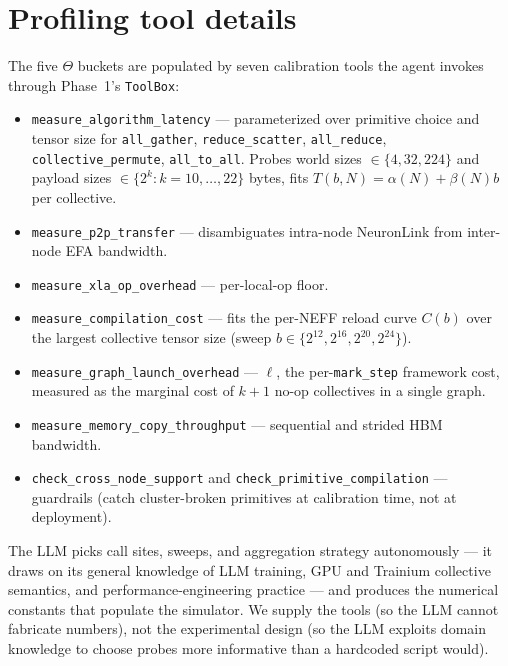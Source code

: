 \section{Profiling tool details}
\label{sec:profile-impl}

The five $\Theta$ buckets are populated by seven
calibration tools the agent invokes through Phase~1's
\texttt{ToolBox}:
\begin{itemize}
  \item \texttt{measure\_algorithm\_latency} ---
  parameterized over primitive choice and tensor size for
  \texttt{all\_gather}, \texttt{reduce\_scatter},
  \texttt{all\_reduce}, \texttt{collective\_permute},
  \texttt{all\_to\_all}. Probes world sizes $\in \{4, 32, 224\}$
  and payload sizes $\in \{2^k : k = 10, \ldots, 22\}$ bytes,
  fits $T(b,N) = \alpha(N) + \beta(N) b$ per collective.
  \item \texttt{measure\_p2p\_transfer} --- disambiguates
  intra-node NeuronLink from inter-node EFA bandwidth.
  \item \texttt{measure\_xla\_op\_overhead} --- per-local-op
  floor.
  \item \texttt{measure\_compilation\_cost} --- fits the
  per-NEFF reload curve $C(b)$ over the largest collective tensor
  size (sweep $b \in \{2^{12}, 2^{16}, 2^{20}, 2^{24}\}$).
  \item \texttt{measure\_graph\_launch\_overhead} --- $\ell$, the
  per-\texttt{mark\_step} framework cost, measured as the
  marginal cost of $k+1$ no-op collectives in a single graph.
  \item \texttt{measure\_memory\_copy\_throughput} --- sequential
  and strided HBM bandwidth.
  \item \texttt{check\_cross\_node\_support} and
  \texttt{check\_primitive\_compilation} --- guardrails (catch
  cluster-broken primitives at calibration time, not at deployment).
\end{itemize}
The LLM picks call sites, sweeps, and aggregation strategy
autonomously --- it draws on its general knowledge of LLM
training, GPU and Trainium collective semantics, and
performance-engineering practice --- and produces the numerical
constants that populate the simulator. We supply the tools (so
the LLM cannot fabricate numbers), not the experimental design
(so the LLM exploits domain knowledge to choose probes more
informative than a hardcoded script would).


